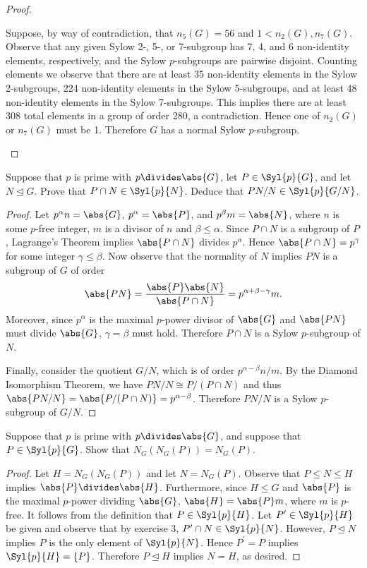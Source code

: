 \documentclass[10pt]{amsart}
\begin{document}
\begin{thm}
\begin{proof}
\begin{enumerate}[(a)]
      Suppose, by way of contradiction, that $n_5(G) = 56$ and $1 < n_2(G), n_7(G)$.
      Observe that any given Sylow 2-, 5-, or 7-subgroup has 7, 4, and 6 non-identity elements, respectively, and the Sylow $p$-subgroups are pairwise disjoint.
      Counting elements we observe that there are at least 35 non-identity elements in the Sylow 2-subgroups, 224 non-identity elements in the Sylow 5-subgroups, and at least 48 non-identity elements in the Sylow 7-subgroups.
      This implies there are at least 308 total elements in a group of order 280, a contradiction.
      Hence one of $n_2(G)$ or $n_7(G)$ must be 1.
      Therefore $G$ has a normal Sylow $p$-subgroup.
    \end{enumerate}
  \end{proof}
\end{thm}
\begin{thm}
  Suppose that $p$ is prime with $p \divides \abs{G}$, let $P \in \Syl{p}{G}$, and let $N \unlhd G$.
  Prove that $P \cap N \in \Syl{p}{N}$.
  Deduce that $PN/N \in \Syl{p}{G/N}$.
  \begin{proof}
    Let $p^{\alpha}n = \abs{G}$, $p^\alpha = \abs{P}$, and $p^\beta m = \abs{N}$, where $n$ is some $p$-free integer, $m$ is a divisor of $n$ and $\beta \leq \alpha$.
    Since $P \cap N$ is a subgroup of $P$, Lagrange's Theorem implies $\abs{P \cap N}$ divides $p^\alpha$.
    Hence $\abs{P \cap N} = p^\gamma$ for some integer $\gamma \leq \beta$.
    Now observe that the normality of $N$ implies $PN$ is a subgroup of $G$ of order $$\abs{PN} = \frac{\abs{P}\abs{N}}{\abs{P \cap N}} = p^{\alpha + \beta - \gamma}m.$$
    Moreover, since $p^\alpha$ is the maximal $p$-power divisor of $\abs{G}$ and $\abs{PN}$ must divide $\abs{G}$, $\gamma = \beta$ must hold.
    Therefore $P \cap N$ is a Sylow $p$-subgroup of $N$.

    Finally, consider the quotient $G/N$, which is of order $p^{\alpha-\beta}n/m$.
    By the Diamond Isomorphism Theorem, we have $PN/N \cong  P/(P\cap N)$ and thus $\abs{PN/N} =  \abs{P/(P\cap N)} = p^{\alpha-\beta}$.
    Therefore $PN/N$ is a Sylow $p$-subgroup of $G/N$.
  \end{proof}
\end{thm}

\begin{thm}
  Suppose that $p$ is prime with $p \divides \abs{G}$, and suppose that $P \in \Syl{p}{G}$.
  Show that $N_G(N_G(P)) = N_G(P)$.
  \begin{proof}
    Let $H = N_G(N_G(P))$ and let $N = N_G(P)$.
    Observe that $P \leq N \leq H$ implies $\abs{P} \divides \abs{H}$.
    Furthermore, since $H \leq G$ and $\abs{P}$ is the maximal $p$-power dividing $\abs{G}$, $\abs{H} = \abs{P}m$, where $m$ is $p$-free.
    It follows from the definition that $P \in \Syl{p}{H}$.
    Let $P^\prime \in \Syl{p}{H}$ be given and observe that by exercise 3, $P^\prime \cap N \in \Syl{p}{N}$.
    However, $P \unlhd N$ implies $P$ is the only element of $\Syl{p}{N}$.
    Hence $P^\prime = P$ implies $\Syl{p}{H} = \left\{P\right\}$.
    Therefore $P \unlhd H$ implies $N = H$, as desired.
  \end{proof}
\end{thm}
\end{document}
